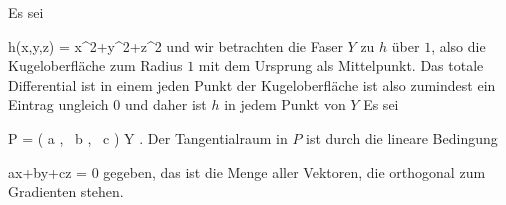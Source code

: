 {

Es sei

\mavergleichskettedisp
{\vergleichskette
{ h(x,y,z)
}
{ =} { x^2+y^2+z^2
}
{ } {
}
{ } {
}
{ } {
}
}
{}{}{}
und wir betrachten die Faser $Y$ zu $h$ über $1$, also die Kugeloberfläche zum Radius $1$ mit dem Ursprung als Mittelpunkt. Das totale Differential ist
 in einem jeden Punkt der Kugeloberfläche ist also zumindest ein Eintrag ungleich $0$ und daher ist $h$ in jedem Punkt von $Y$
Es sei

\mavergleichskette
{\vergleichskette
{ P
}
{ = }{ \left(  a   , \,   b  , \,  c                 \right)
}
{ \in }{ Y
}
{    }{
}
{   }{
}
}
{}{}{.}
Der Tangentialraum in $P$ ist durch die lineare Bedingung

\mavergleichskettedisp
{\vergleichskette
{ ax+by+cz
}
{ =} { 0
}
{ } {
}
{ } {
}
{ } {
}
}
{}{}{}
gegeben, das ist die Menge aller Vektoren, die orthogonal zum Gradienten
 stehen.

}

